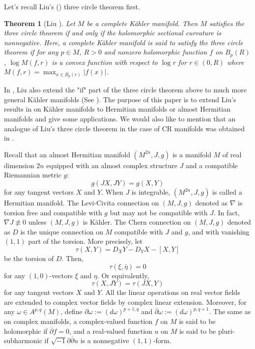 \documentclass[12pt]{amsart}
\def\p{\partial}
\def\dbar{\overline{\partial }}
\def\iddbar{{\sqrt{-1}\partial \overline\partial}}
\newtheorem{thm}{Theorem}[section]
\theoremstyle{definition}
\theoremstyle{remark}
\numberwithin{equation}{section}
\begin{document}
Let's recall Liu's (\cite{Liu}) three circle theorem first.
\begin{thm}[Liu \cite{Liu}]\label{thm-Liu}
Let $M$ be a complete K\"ahler manifold. Then $M$ satisfies the three circle theorem if and only if the holomorphic sectional curvature is nonnegative. Here, a complete K\"ahler manifold is said to satisfy the three circle theorem if for any $p\in M$, $R>0$  and nonzero holomorphic function $f$ on $B_p(R)$, $\log M(f,r)$ is a convex function with respect to $\log r$ for $r\in (0,R)$ where $M(f,r)=\max_{x\in B_p(r)}|f(x)|$.
\end{thm}
In \cite{Liu}, Liu also extend the "if" part of the three circle theorem above to much more general K\"ahler manifolds (See \cite[Theorem 8]{Liu} ).  The purpose of this paper is to extend Liu's results in \cite{Liu} on K\"ahler manifolds to Hermitian manifolds or almost Hermitian manifolds and give some applications. We would also like to mention that an analogue of Liu's three circle theorem in the case of CR manifolds was obtained in \cite{CHL}.

Recall that an almost Hermitian manifold $(M^{2n},J,g)$ is a manifold $M$ of real dimension $2n$ equipped with an almost complex structure $J$ and a compatible Riemannian metric $g$:
$$g(JX,JY)=g(X,Y)$$
for any tangent vectors $X$ and $Y$. When $J$ is integrable, $(M^{2n},J,g)$ is called a Hermitian manifold. The Levi-Civita connection on $(M,J,g)$ denoted as $\nabla$ is torsion free and compatible with $g$ but may not be compatible with $J$. In fact, $\nabla J\not\equiv 0$ unless $(M,J,g)$ is K\"ahler. The Chern connection on $(M,J,g)$ denoted as $D$ is the unique connection on $M$ compatible with $J$ and $g$, and with vanishing $(1,1)$ part of the torsion. More precisely, let
\begin{equation}
\tau(X,Y)=D_XY-D_YX-[X,Y]
\end{equation}
be the torsion of $D$. Then,
\begin{equation}\label{eq-vanishing-1-1}
\tau(\xi,\bar\eta)=0
\end{equation}
for any $(1,0)$-vectors $\xi$ and $\eta$. Or equivalently,
\begin{equation}\label{eq-vanishing-1-1-J}
\tau(X,JY)=\tau(JX,Y)
\end{equation}
for any tangent vectors $X$ and $Y$. All the linear operations on real vector fields are extended to complex vector fields by complex linear extension. Moreover, for any $\omega\in A^{p,q}(M)$, define $\p \omega:=(d\omega)^{p+1,q}$ and $\dbar\omega:=(d\omega)^{p,q+1}$.  The same as on complex manifolds, a complex-valued function $f$ on $M$ is said to be holomorphic if $\dbar f=0$, and a real-valued function $u$ on $M$ is said to be pluri-subharmonic if $\iddbar u$ is a nonnegative $(1,1)$-form.
\end{document}
